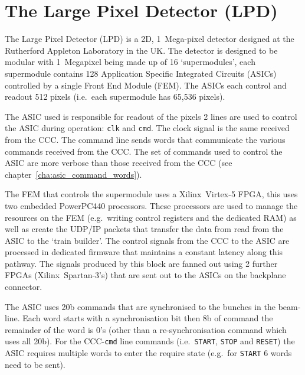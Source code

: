 \section{The Large Pixel Detector (LPD)} %
\label{sec:the_large_pixel_detector_lpd}
The Large Pixel Detector (LPD) is a 2D, 1~Mega-pixel detector designed at the Rutherford Appleton Laboratory in the UK. The detector is designed to be modular with 1~Megapixel being made up of 16 `supermodules', each supermodule contains 128 Application Specific Integrated Circuits (ASICs) controlled by a single Front End Module (FEM). The ASICs each control and readout 512 pixels (i.e.\ each supermodule has 65,536 pixels).
    
The ASIC used is responsible for readout of the pixels 2 lines are used to control the ASIC during operation: \texttt{clk} and \texttt{cmd}. The clock signal is the same received from the CCC. The command line sends words that communicate the various commands received from the CCC. The set of commands used to control the ASIC are more verbose than those received from the CCC (see chapter~\ref{cha:asic_command_words}). 
    
The FEM that controls the supermodule uses a Xilinx~Virtex-5 FPGA, this uses two embedded PowerPC440 processors. These processors are used to manage the resources on the FEM (e.g.\ writing control registers and the dedicated RAM) as well as create the UDP/IP packets that transfer the data from read from the ASIC to the `train builder'. The control signals from the CCC to the ASIC are processed in dedicated firmware that maintains a constant latency along this pathway. The signals produced by this block are fanned out using 2 further FPGAs (Xilinx~Spartan-3's) that are sent out to the ASICs on the backplane connector.
    
The ASIC uses 20b commands that are synchronised to the bunches in the beam-line. Each word starts with a synchronisation bit then 8b of command the remainder of the word is 0's (other than a re-synchronisation command which uses all 20b). For the CCC-\texttt{cmd} line commands (i.e.\ \texttt{START}, \texttt{STOP} and \texttt{RESET}) the ASIC requires multiple words to enter the require state (e.g.\ for \texttt{START} 6 words need to be sent).
% 
    

